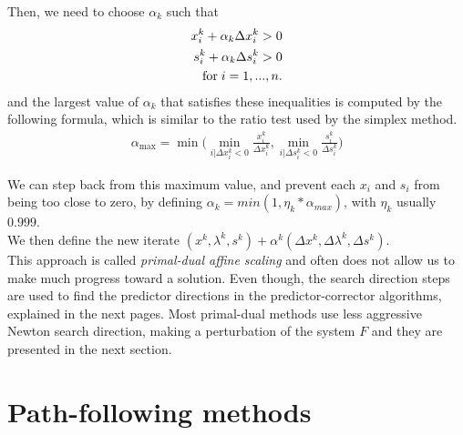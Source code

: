 \documentclass[a4paper,10 pt,titlepage,twoside]{book}
\theoremstyle{plain}
\theoremstyle{definition}
\theoremstyle{remark}
\begin{document}
Then, we need to choose $\alpha_{k}$ such that
\begin{align*}
x^{k}_{i} + \alpha_{k} \Delta x^{k}_{i} >0 \\
s^{k}_{i} + \alpha_{k} \Delta s^{k}_{i} >0 \\	\text{for\;} i = 1,...,n.
\end{align*}
and the largest value of $\alpha_{k}$ that satisfies these inequalities is computed by the following formula, which is similar to the ratio test used by the simplex method. 
\begin{align*}
\alpha_{\max} = \min\bigg(\min_{i|\Delta x^{k}_{i}<0}\frac{x^{k}_{i}}{\Delta x^{k}_{i}}, \min_{i|\Delta s^{k}_{i}<0}\frac{s^{k}_{i}}{\Delta s^{k}_{i}}\bigg)
\end{align*} 

We can step back from this maximum value, and prevent each $x_{i}$ and $s_{i}$ from being too close to zero, by defining $\alpha_{k} = min\left(1,\eta_{k}*\alpha_{max}\right)$, with $\eta_{k}$ usually $0.999$.\\
We then define the new iterate $(x^{k},\lambda^{k},s^{k}) +\alpha^{k} (\Delta x^{k},\Delta \lambda^{k},\Delta s^{k})$.\\
This approach is called \textit{primal-dual affine scaling} and often does not allow us to make much progress toward a solution. Even though, the search direction steps are used to find the predictor directions in the predictor-corrector algorithms, explained in the next pages. 
Most primal-dual methods use less aggressive Newton search direction, making a perturbation of the system $F$ and they are presented in the next section.

\section{Path-following methods}
\end{document}
